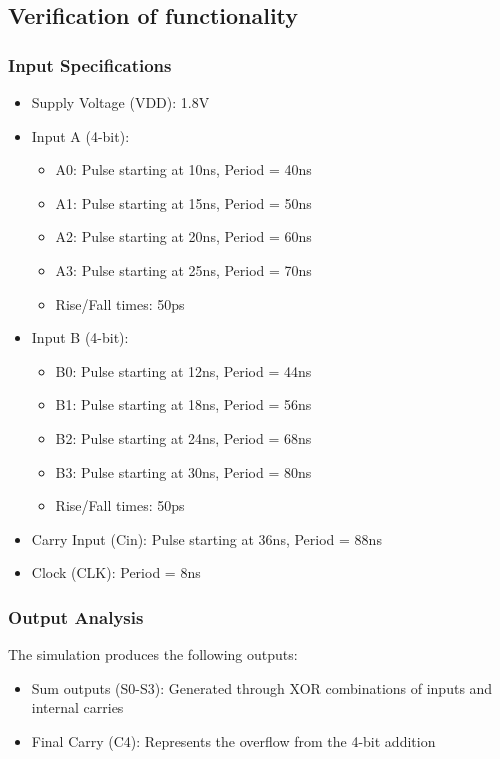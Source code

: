 \documentclass[conference]{IEEEtran}
\begin{document}
\subsection{Verification of functionality}
\subsubsection{Input Specifications}
\begin{itemize}
    \item Supply Voltage (VDD): 1.8V
    \item Input A (4-bit):
    \begin{itemize}
        \item A0: Pulse starting at 10ns, Period = 40ns
        \item A1: Pulse starting at 15ns, Period = 50ns
        \item A2: Pulse starting at 20ns, Period = 60ns
        \item A3: Pulse starting at 25ns, Period = 70ns
        \item Rise/Fall times: 50ps
    \end{itemize}
    
    \item Input B (4-bit):
    \begin{itemize}
        \item B0: Pulse starting at 12ns, Period = 44ns
        \item B1: Pulse starting at 18ns, Period = 56ns
        \item B2: Pulse starting at 24ns, Period = 68ns
        \item B3: Pulse starting at 30ns, Period = 80ns
        \item Rise/Fall times: 50ps
    \end{itemize}
    \item Carry Input (Cin): Pulse starting at 36ns, Period = 88ns
    \item Clock (CLK): Period = 8ns
\end{itemize}

\subsubsection{Output Analysis}
The simulation produces the following outputs:
\begin{itemize}
    \item Sum outputs (S0-S3): Generated through XOR combinations of inputs and internal carries
    \item Final Carry (C4): Represents the overflow from the 4-bit addition
\end{itemize}
\end{document}
